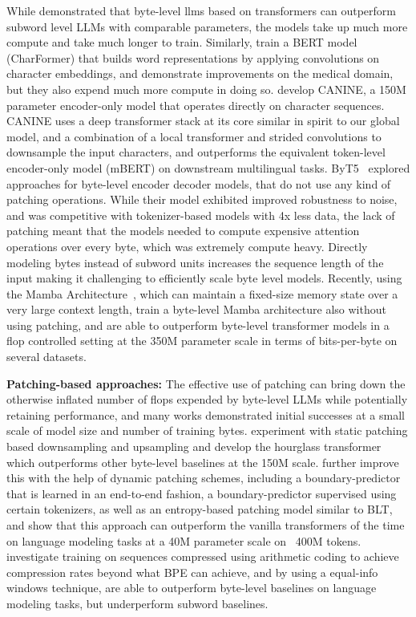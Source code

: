 While \cite{Choe2019BridgingTG} demonstrated that byte-level llms based on transformers can outperform subword level LLMs with comparable parameters, the models take up much more compute and take much longer to train. Similarly, \cite{el2020characterbert} train a BERT model (CharFormer) that builds word representations by applying convolutions on character embeddings, and demonstrate improvements on the medical domain, but they also expend much more compute in doing so. \cite{clark2022canine} develop CANINE, a 150M parameter encoder-only model that operates directly on character sequences. CANINE uses a deep transformer stack at its core similar in spirit to our global model, and a combination of a local transformer and strided convolutions to downsample the input characters, and outperforms the equivalent token-level encoder-only model (mBERT) on downstream multilingual tasks. ByT5~\citep{xue2022byt5} explored approaches for byte-level encoder decoder models, that do not use any kind of patching operations. While their model exhibited improved robustness to noise, and was competitive with tokenizer-based models with 4x less data, the lack of patching meant that the models needed to compute expensive attention operations over every byte, which was extremely compute heavy. Directly modeling bytes instead of subword units increases the sequence length of the input making it challenging to efficiently scale byte level models. Recently, using the Mamba Architecture~\citep{gu2023mamba},  which can maintain a fixed-size memory state over a very large context length, \cite{wang2024mambabyte} train a byte-level Mamba architecture also without using patching, and are able to outperform byte-level transformer models in a flop controlled setting at the 350M parameter scale in terms of bits-per-byte on several datasets.  

\textbf{Patching-based approaches:} The effective use of patching can bring down the otherwise inflated number of flops expended by byte-level LLMs while potentially retaining performance, and many works demonstrated initial successes at a small scale of model size and number of training bytes. \cite{nawrot-etal-2022-hierarchical} experiment with static patching based downsampling and upsampling and develop the hourglass transformer which outperforms other byte-level baselines at the 150M scale. \cite{nawrot-etal-2023-efficient} further improve this with the help of dynamic patching schemes, including a boundary-predictor that is learned in an end-to-end fashion, a boundary-predictor supervised using certain tokenizers, as well as an entropy-based patching model similar to {\textsc BLT}, and show that this approach can outperform the vanilla transformers of the time on language modeling tasks at a 40M parameter scale on ~400M tokens. \cite{lester2024training} investigate training on sequences compressed using arithmetic coding to achieve compression rates beyond what BPE can achieve, and by using a equal-info windows technique, are able to outperform byte-level baselines on language modeling tasks, but underperform subword baselines.

